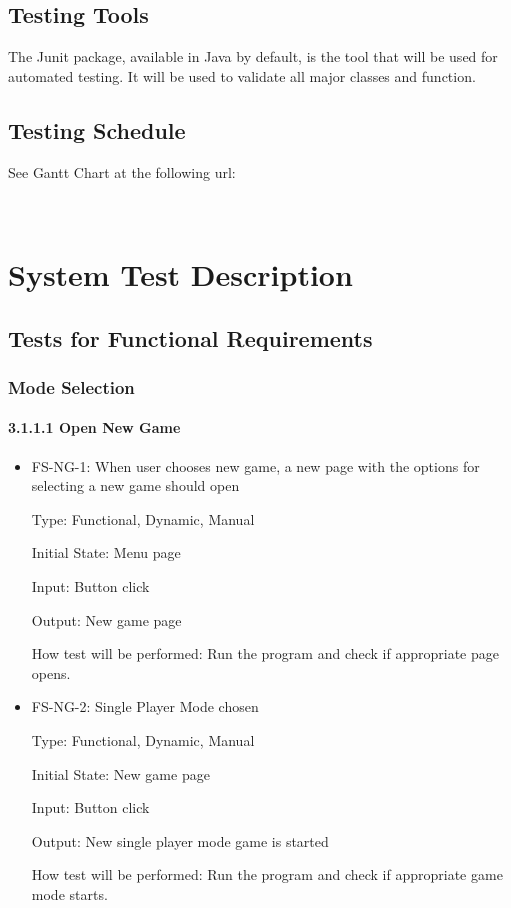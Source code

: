 \documentclass[12pt,letterpaper]{article}
\begin{document}
	\subsection{Testing Tools}
	The Junit package, available in Java by default, is the tool that will be used for automated testing. It will be used to validate all major classes and function.
	
	\subsection{Testing Schedule}
	See Gantt Chart at the following url:

\noindent {}\\

	\section{System Test Description}
	\subsection{Tests for Functional Requirements}
	\subsubsection{Mode Selection}
	\paragraph{3.1.1.1 Open New Game}
\begin{reqbox}
	\begin{itemize}

	\item FS-NG-1: When user chooses new game, a new page with the options for selecting a new game should open
	
	Type: Functional, Dynamic, Manual

	Initial State: Menu page

	Input: Button click

	Output: New game page

	How test will be performed: Run the program and check if appropriate page opens.
	\end{itemize}
\end{reqbox}

\begin{reqbox}
	\begin{itemize}
	\item FS-NG-2: Single Player Mode chosen

	Type: Functional, Dynamic, Manual

	Initial State: New game page

	Input: Button click

	Output: New single player mode game is started

	How test will be performed: Run the program and check if appropriate game mode starts.
	\end{itemize}
\end{reqbox}
\end{document}
